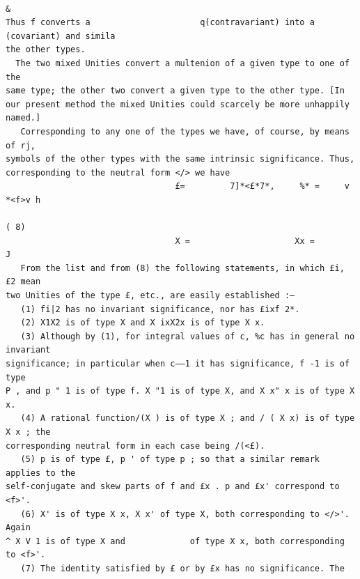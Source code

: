 \documentclass[10pt]{article}
\begin{document}
\begin{verbatim}
                                                                                                                &
Thus f converts a                      q(contravariant) into a (covariant) and simila
the other types.
  The two mixed Unities convert a multenion of a given type to one of the
same type; the other two convert a given type to the other type. [In
our present method the mixed Unities could scarcely be more unhappily
named.]
   Corresponding to any one of the types we have, of course, by means of rj,
symbols of the other types with the same intrinsic significance. Thus,
corresponding to the neutral form </> we have
                                  £=         7]*<£*7*,     %* =     v *<f>v h
                                                                                                                     ( 8)
                                  X =                     Xx =                  J
   From the list and from (8) the following statements, in which £i, £2 mean
two Unities of the type £, etc., are easily established :—
   (1) fi|2 has no invariant significance, nor has £ixf 2*.
   (2) X1X2 is of type X and X ixX2x is of type X x.
   (3) Although by (1), for integral values of c, %c has in general no invariant
significance; in particular when c——1 it has significance, f -1 is of type
P , and p " 1 is of type f. X "1 is of type X, and X x" x is of type X x.
   (4) A rational function/(X ) is of type X ; and / ( X x) is of type X x ; the
corresponding neutral form in each case being /(<£).
   (5) p is of type £, p ' of type p ; so that a similar remark applies to the
self-conjugate and skew parts of f and £x . p and £x' correspond to <f>'.
   (6) X' is of type X x, X x' of type X, both corresponding to </>'. Again
^ X V 1 is of type X and             of type X x, both corresponding to <f>'.
   (7) The identity satisfied by £ or by £x has no significance. The


\end{verbatim}
\clearpage
\end{document}

